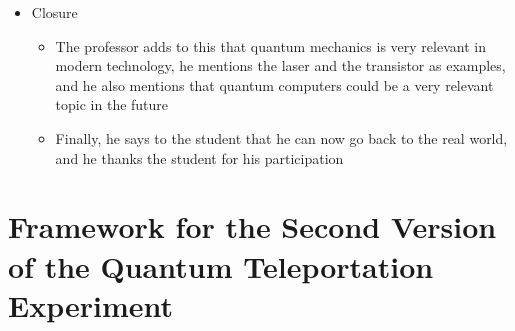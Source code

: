 \documentclass[11pt,twoside]{report} %
\begin{document}
\begin{itemize}
\begin{itemize}
	\end{itemize}
	\item Closure
	\begin{itemize}
		\item The professor adds to this that quantum mechanics is very relevant in modern technology, he mentions the laser and the transistor as examples, and he also mentions that quantum computers could be a very relevant topic in the future
		\item Finally, he says to the student that he can now go back to the real world, and he thanks the student for his participation
	\end{itemize}
\end{itemize}

\newpage

\chapter{Framework for the Second Version of the Quantum Teleportation Experiment}
\label{app:teleportation2}
\end{document}
